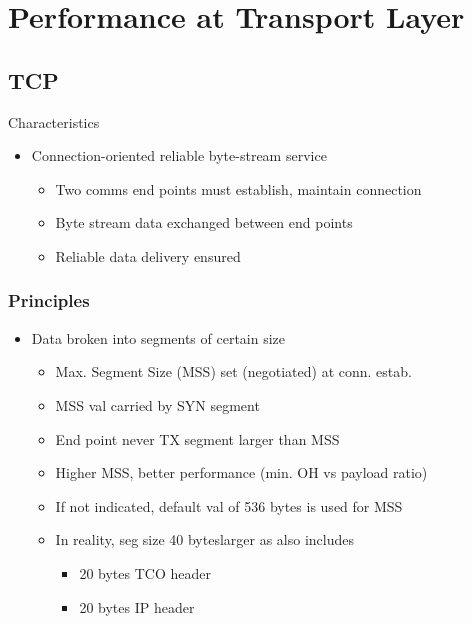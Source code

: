 \section{Performance at Transport Layer}
\subsection{TCP}
Characteristics
\begin{itemize}
	\item Connection-oriented reliable byte-stream service
	\begin{itemize}
		\item Two comms end points must establish, maintain connection
		\item Byte stream data exchanged between end points
		\item Reliable data delivery ensured
	\end{itemize}
\end{itemize}
\subsubsection{Principles}
\begin{itemize}
	\item Data broken into segments of certain size
	\begin{itemize}
		\item Max. Segment Size (MSS) set (negotiated) at conn. estab.
		\item MSS val carried by SYN segment
		\item End point never TX segment larger than MSS
		\item Higher MSS, better performance (min. OH vs payload ratio)
		\item If not indicated, default val of 536 bytes is used for MSS
		\item In reality, seg size 40 byteslarger as also includes
			\begin{itemize}
				\item 20 bytes TCO header
				\item 20 bytes IP header
			\end{itemize}
	\end{itemize}
\end{itemize}
